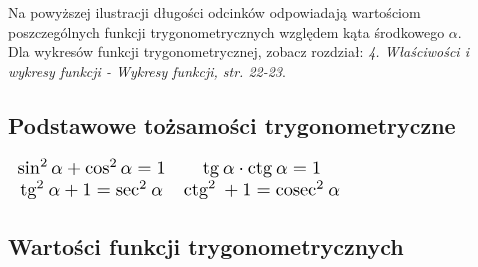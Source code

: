 \documentclass[14pt,a4paper]{extarticle}
\newcommand{\scalemath}[2][4]{\scalebox{#1}{\ensuremath{#2}}}
\begin{document}
\noindent Na powyższej ilustracji długości odcinków odpowiadają wartościom poszczególnych
funkcji trygonometrycznych względem kąta środkowego $\alpha$.\\

\noindent Dla wykresów funkcji trygonometrycznej, zobacz rozdział: \textit{4. Właściwości i wykresy funkcji - Wykresy funkcji, str. 22-23}.
\subsection{Podstawowe tożsamości trygonometryczne}

\begin{center}
{%
\renewcommand{\arraystretch}{2}
\renewcommand{\arraycolsep}{0.5cm}

\(
   \scalemath[1.3]{%
   \begin{array}{cc}
      \sin^{2} \alpha + \cos^{2} \alpha = 1 & \text{tg}\: \alpha \cdot \text{ctg}\: \alpha = 1\\
      \text{tg}^{2}\: \alpha + 1 = \text{sec}^{2}\: \alpha & \text{ctg}^{2}\: + 1 = \text{cosec}^{2}\: \alpha   
   \end{array}
   }%
\)

}%
\end{center}

\newpage















\subsection{Wartości funkcji trygonometrycznych}
\end{document}
